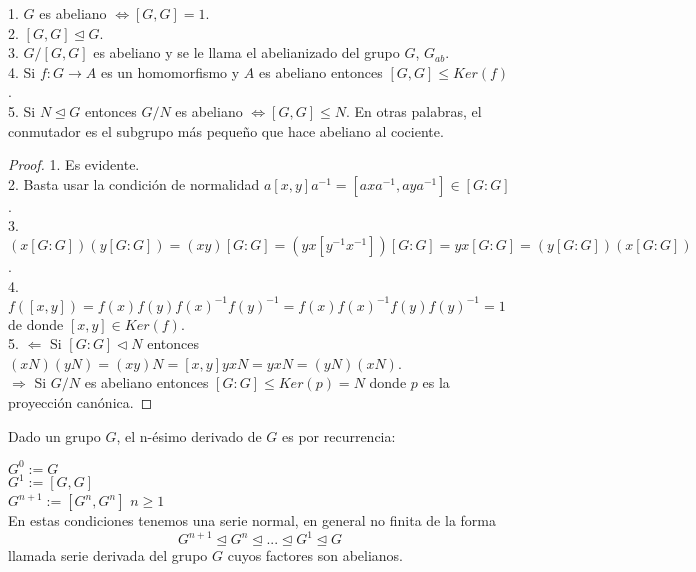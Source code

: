 \begin{proposition}
1. $G$ es abeliano $\iff [G,G] = 1$.\\
2. $[G,G] \trianglelefteq G$.\\
3. $G/[G,G]$ es abeliano y se le llama el abelianizado del grupo $G$, $G_{ab}$.\\
4. Si $f:G \rightarrow A$ es un homomorfismo y $A$ es abeliano entonces $[G,G] \le Ker(f)$.\\
5. Si $N \trianglelefteq G$ entonces $G/N$ es abeliano $\iff [G,G] \le N$. En otras palabras, el conmutador es el subgrupo más pequeño que hace abeliano al cociente.
\end{proposition}
\begin{proof}
1. Es evidente.\\
2. Basta usar la condición de normalidad $a[x,y]a^{-1} = [axa^{-1},aya^{-1}] \in [G:G]$.\\
3. $(x[G:G])(y[G:G]) = (xy)[G:G] = (yx[y^{-1}x^{-1}])[G:G] = yx[G:G] = (y[G:G])(x[G:G])$.\\
4. $f([x,y]) = f(x)f(y)f(x)^{-1}f(y)^{-1} = f(x)f(x)^{-1}f(y)f(y)^{-1} = 1$ de donde $[x,y] \in Ker(f)$.\\
5. $\Leftarrow$ Si $[G:G] \triangleleft N$ entonces $(xN)(yN)=(xy)N=[x,y]yxN=yxN = (yN)(xN)$.\\
$\Rightarrow$ Si $G/N$ es abeliano entonces $[G:G] \le Ker(p) = N$ donde $p$ es la proyección canónica.
\end{proof}

\begin{definition}
Dado un grupo $G$, el n-ésimo derivado de $G$ es por recurrencia:

$G^{0}:= G$\\
$G^{1}:= [G,G]$\\
$G^{n+1}:=[G^{n},G^{n}]$ $n \ge 1$\\

En estas condiciones tenemos una serie normal, en general no finita de la forma $$G^{n+1} \trianglelefteq G^{n} \trianglelefteq ... \trianglelefteq G^{1} \trianglelefteq G$$ llamada serie derivada del grupo $G$ cuyos factores son abelianos.
\end{definition}

